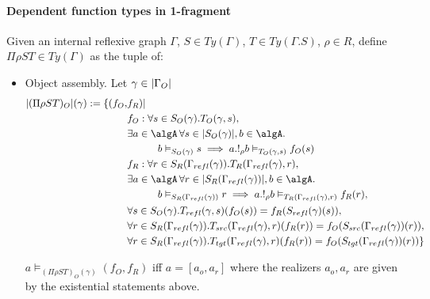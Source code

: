 \documentclass[12pt,a4paper]{article}
\def\src{_{src}}\alwaysmath{src}
\def\rfl{_{refl}}\alwaysmath{rfl}
\def\tgt{_{tgt}}\alwaysmath{tgt}
\renewcommand{\O}{_{O}}\alwaysmath{O}
\def\R{_{R}}\alwaysmath{R}
\begin{document}
\paragraph{Dependent function types in 1-fragment}
Given an internal reflexive graph $\Gamma$, $S \in Ty(\Gamma)$, $T \in Ty(\Gamma.S)$, $\rho \in R$, define $\Pi\rho S T \in Ty(\Gamma)$ as the tuple of:
\begin{itemize}[noitemsep]
  \item Object assembly. Let $\gamma \in \carr{\Gamma\O}$
    \begin{align*}
      |(\Pi \rho S T)\O|(\gamma) \define \{ (f\O,& f\R) | \\
      & f\O : \forall s \in S\O(\gamma).T\O(\gamma, s),\\
      & \exists a \in \algA\, \forall s \in \carr{S\O(\gamma)}, b \in \algA.\\
      & \hspace{3em} b \vDash_{S\O(\gamma)} s \implies a . !_\rho b \vDash_{T\O(\gamma,s)} f\O(s) \\
      & f\R : \forall r \in S\R(\Gamma\rfl(\gamma)). T\R(\Gamma\rfl(\gamma), r),\\
      & \exists a \in \algA\, \forall r \in \carr{S\R(\Gamma\rfl(\gamma))}, b \in \algA.\\ 
      & \hspace{3em} b \vDash_{S\R(\Gamma\rfl(\gamma))} r \implies a . !_\rho b \vDash_{T\R(\Gamma\rfl(\gamma),r)} f\R(r),\\
      & \forall s \in S\O(\gamma). T\rfl(\gamma, s)(f\O (s)) = f\R(S\rfl(\gamma)(s)),\\
      & \forall r \in S\R(\Gamma\rfl(\gamma)). T\src(\Gamma\rfl(\gamma),r)(f\R (r)) = f\O(S\src(\Gamma\rfl(\gamma))(r)),\\
      & \forall r \in S\R(\Gamma\rfl(\gamma)). T\tgt(\Gamma\rfl(\gamma),r)(f\R (r)) = f\O(S\tgt(\Gamma\rfl(\gamma))(r))  \}
    \end{align*}
    
    $ a \vDash_{(\Pi \rho S T)\O(\gamma)} (f\O, f\R)$ iff $a = [a_o, a_r]$ where the realizers $a_o, a_r$ are given by the existential statements above.
    

\end{itemize}
\end{document}
